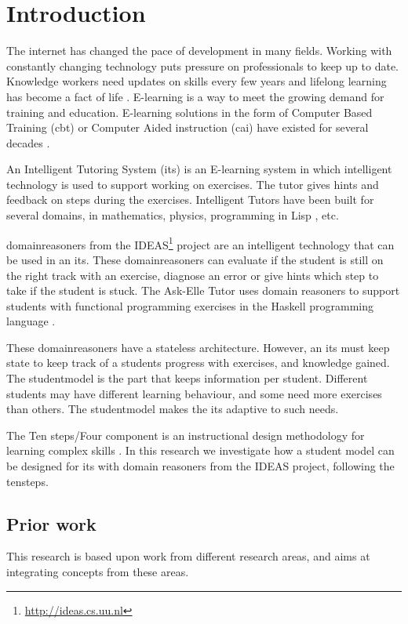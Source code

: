 \chapter{Introduction}
The internet has changed the pace of development in many fields. 
Working with constantly changing technology puts pressure on professionals to keep up to date.
Knowledge workers need updates on skills every few years and lifelong learning has become a fact of life \citep{lifelonglearning}.
E-learning is a way to meet the growing demand for training and education.
E-learning solutions in the form of Computer Based Training (\gls{cbt}) or Computer Aided instruction (\gls{cai}) have existed for several decades \citep{woolf_2010}.

An Intelligent Tutoring System (\gls{its}) is an E-learning system in which intelligent technology is used to support working on exercises.
The tutor gives hints and feedback on steps during the exercises.
Intelligent Tutors have been built for several domains,  in mathematics, physics, programming in Lisp  \citep{tutor-pat, tutor-andes, anderson1986}, etc. 

\Glspl{domainreasoner} from the  IDEAS\footnote{\url{http://ideas.cs.uu.nl}}  project are an intelligent technology that can be used in an \gls{its}.
These \glspl{domainreasoner} can evaluate if the student is still on the right track with an exercise, diagnose an error or give hints which step to take if the student is stuck.
The Ask-Elle Tutor uses domain reasoners to support students with functional programming  exercises in the Haskell programming language \citep{Gerdes2017}. 


These \glspl{domainreasoner} have a stateless architecture. 
However, an \gls{its} must keep state to keep track of a students progress with exercises, and knowledge gained.
The \gls{studentmodel} is the part that keeps information per student.
Different students may have different learning behaviour, and some need more exercises than others. 
The \gls{studentmodel} makes the \gls{its} adaptive to such needs.

The Ten steps/Four component is an instructional design methodology for learning complex skills \citep{kirschner_2013}.
In this research we investigate how a student model can be designed for \gls{its} with domain reasoners from the IDEAS project, following the \gls{tensteps}.



\section{Prior work}
This research is based upon work from different research areas, and aims at integrating concepts from these areas.

